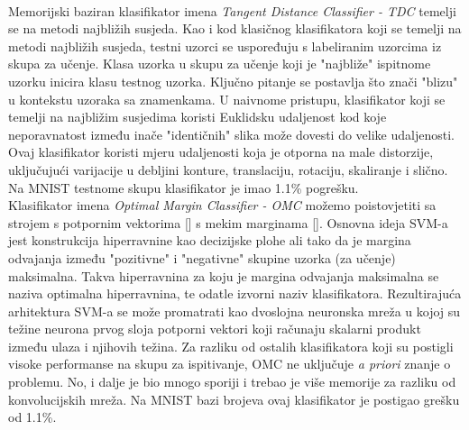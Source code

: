 \documentclass[times, utf8, diplomski]{fer}
\theoremstyle{definition}
\begin{document}
\\
Memorijski baziran klasifikator imena \textit{Tangent Distance Classifier - TDC} temelji se na metodi najbližih susjeda. Kao i kod klasičnog klasifikatora koji se temelji na metodi najbližih susjeda, testni uzorci se uspoređuju s labeliranim uzorcima iz skupa za učenje. Klasa uzorka u skupu za učenje koji je "najbliže" ispitnome uzorku inicira klasu testnog uzorka. Ključno pitanje se postavlja što znači "blizu" u kontekstu uzoraka sa znamenkama. U naivnome pristupu, klasifikator koji se temelji na najbližim susjedima koristi Euklidsku udaljenost kod koje neporavnatost između inače "identičnih" slika može dovesti do velike udaljenosti. Ovaj klasifikator koristi mjeru udaljenosti koja je otporna na male distorzije, uključujući varijacije u debljini konture, translaciju, rotaciju, skaliranje i slično. Na MNIST testnome skupu klasifikator je imao 1.1\% pogrešku.
\\
Klasifikator imena \textit{Optimal Margin Classifier - OMC} možemo poistovjetiti sa strojem s potpornim vektorima  [\cite{Boser92atraining}] s mekim marginama [\cite{Cortes:1995:SN:218919.218929}]. Osnovna ideja SVM-a jest konstrukcija hiperravnine kao decizijske plohe ali tako da je margina odvajanja između "pozitivne" i "negativne" skupine uzorka (za učenje) maksimalna. Takva hiperravnina za koju je margina odvajanja maksimalna se naziva optimalna hiperravnina, te odatle izvorni naziv klasifikatora. Rezultirajuća arhitektura SVM-a se može promatrati kao dvoslojna neuronska mreža u kojoj su težine neurona prvog sloja potporni vektori koji računaju skalarni produkt između ulaza i njihovih težina. Za razliku od ostalih klasifikatora koji su postigli visoke performanse na skupu za ispitivanje, OMC ne uključuje \textit{a priori} znanje o problemu. No, i dalje je bio mnogo sporiji i trebao je više memorije za razliku od konvolucijskih mreža. Na MNIST bazi brojeva ovaj klasifikator je postigao grešku od 1.1\%.
\\
\end{document}
